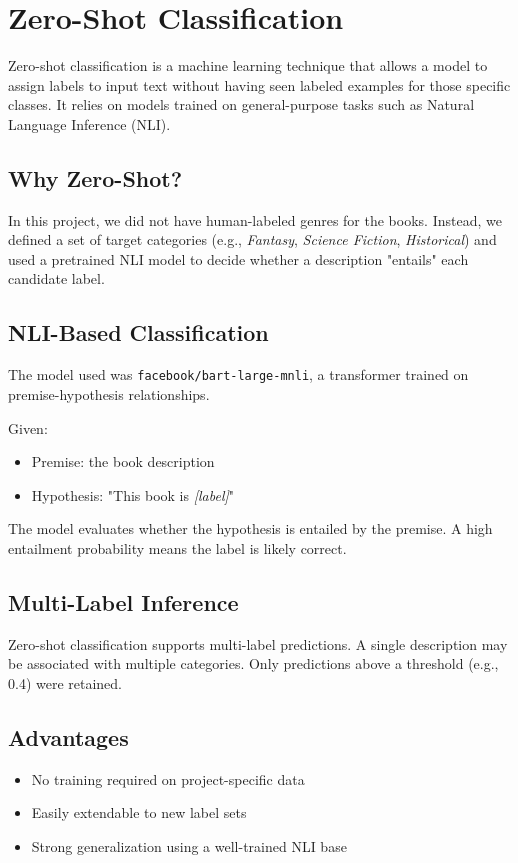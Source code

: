 \chapter{Zero-Shot Classification}
\label{appendix:zero-shot}

Zero-shot classification is a machine learning technique that allows a model to assign labels to input text without having seen labeled examples for those specific classes. It relies on models trained on general-purpose tasks such as Natural Language Inference (NLI).

\section*{Why Zero-Shot?}
In this project, we did not have human-labeled genres for the books. Instead, we defined a set of target categories (e.g., \textit{Fantasy}, \textit{Science Fiction}, \textit{Historical}) and used a pretrained NLI model to decide whether a description "entails" each candidate label.

\section*{NLI-Based Classification}
The model used was \texttt{facebook/bart-large-mnli}, a transformer trained on premise-hypothesis relationships.

Given:
\begin{itemize}
  \item Premise: the book description
  \item Hypothesis: "This book is \textit{[label]}"
\end{itemize}
The model evaluates whether the hypothesis is entailed by the premise. A high entailment probability means the label is likely correct.

\section*{Multi-Label Inference}
Zero-shot classification supports multi-label predictions. A single description may be associated with multiple categories. Only predictions above a threshold (e.g., 0.4) were retained.

\section*{Advantages}
\begin{itemize}
  \item No training required on project-specific data
  \item Easily extendable to new label sets
  \item Strong generalization using a well-trained NLI base
\end{itemize}

